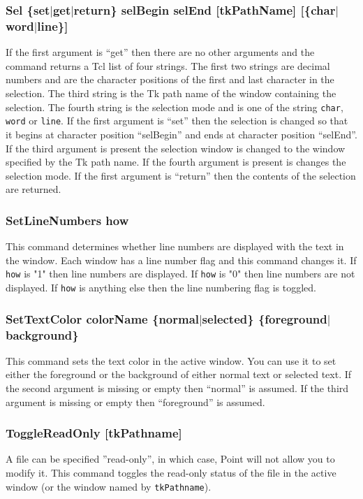 \subsubsection{Sel \{set$\mid$get$\mid$return\} selBegin selEnd [tkPathName]
			[\{char$\mid$word$\mid$line\}]}
If the first argument is ``get'' then there are no other arguments
and the command returns a Tcl list of four strings.
The first two strings are decimal numbers and are the character positions
of the first and last character in the selection.
The third string is the Tk path name of the window containing
the selection.
The fourth string is the selection mode and is one of the
string {\tt char}, {\tt word} or {\tt line}.
If the first argument is ``set'' then the selection is changed
so that it begins at character position ``selBegin'' and ends
at character position ``selEnd''.
If the third argument is present the selection window is changed to
the window specified by the Tk path name.
If the fourth argument is present is changes the
selection mode.
If the first argument is ``return'' then the contents of the
selection are returned.

\subsubsection{SetLineNumbers how}
This command determines whether line numbers are displayed
with the text in the window.
Each window has a line number flag and this command changes it.
If {\tt how} is "1" then line numbers are displayed.
If {\tt how} is "0" then line numbers are not displayed.
If {\tt how} is anything else then the line numbering flag is toggled.

\subsubsection{SetTextColor colorName \{normal$\mid$selected\}
     \{foreground$\mid$background\} }
This command sets the text color in the active window.
You can use it to set either the foreground or the background
of either normal text or selected text.
If the second argument is missing or empty then ``normal''
is assumed.
If the third argument is missing or empty then ``foreground''
is assumed.

\subsubsection{ToggleReadOnly [tkPathname]}
A file can be specified ''read-only'', in which case,
Point will not allow you to modify it.
This command toggles the read-only status of the file
in the active window (or the window named by {\tt tkPathname}).








